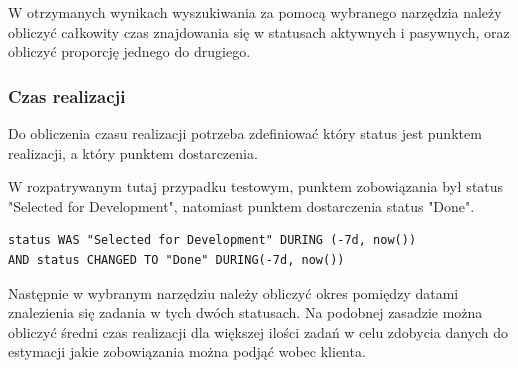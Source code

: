 W otrzymanych wynikach wyszukiwania za pomocą wybranego narzędzia należy obliczyć całkowity czas znajdowania się w statusach aktywnych i pasywnych, oraz obliczyć proporcję jednego do drugiego.

\subsubsection*{Czas realizacji}
Do obliczenia czasu realizacji potrzeba zdefiniować który status jest punktem realizacji, a który punktem dostarczenia.

W rozpatrywanym tutaj przypadku testowym, punktem zobowiązania był status "Selected for Development", natomiast punktem dostarczenia status "Done".
\begin{lstlisting}[caption=Zapytanie JQL pozwalające obliczyć czas dostarczenia w przeciągu ostatniego tygodnia]
status WAS "Selected for Development" DURING (-7d, now())
AND status CHANGED TO "Done" DURING(-7d, now())
\end{lstlisting}

Następnie w wybranym narzędziu należy obliczyć okres pomiędzy datami znalezienia się zadania w tych dwóch statusach.
Na podobnej zasadzie można obliczyć średni czas realizacji dla większej ilości zadań w celu zdobycia danych do estymacji jakie zobowiązania można podjąć wobec klienta.
